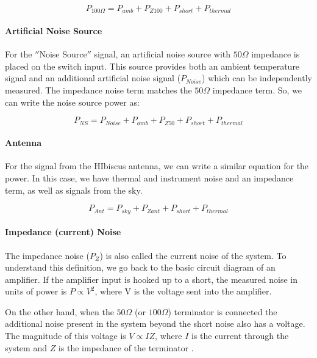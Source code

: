 \begin{equation}
P_{100 \Omega} = P_{amb}+P_{Z100}+P_{short}+P_{thermal}
\end{equation}

\paragraph{Artificial Noise Source}

For the $''$Noise Source$''$ signal, an artificial noise source with $50 \Omega$ impedance is placed on the switch input. This source provides both an ambient temperature signal and an additional artificial noise signal ($P_{Noise}$) which can be independently measured. The impedance noise term matches the $50 \Omega$ impedance term. So, we can write the noise source power as:

\begin{equation}
P_{NS} = P_{Noise} + P_{amb}+P_{Z50}+P_{short} +P_{thermal}
\end{equation}


\paragraph{Antenna}

For the signal from the HIbiscus antenna, we can write a similar equation for the power. In this case, we have thermal and instrument noise and an impedance term, as well as signals from the sky. 

\begin{equation}\label{Eq:T_ant}
P_{Ant} = P_{sky}+P_{Zant}+P_{short} + P_{thermal}
\end{equation}

\paragraph{Impedance (current) Noise} 

The impedance noise ($P_Z$) is also called the current noise of the system. To understand this definition, we go back to the basic circuit diagram of an amplifier. If the amplifier input is hooked up to a short, the measured noise in units of power is $P \propto V^2$, where V is the voltage sent into the amplifier. 

On the other hand, when the $50 \Omega$ (or $100 \Omega$) terminator is connected the additional noise present in the system beyond the short noise also has a voltage. The magnitude of this voltage is $V\propto I Z$, where $I$ is the current through the system and $Z$ is the impedance of the terminator \cite{stutzman1981}.

